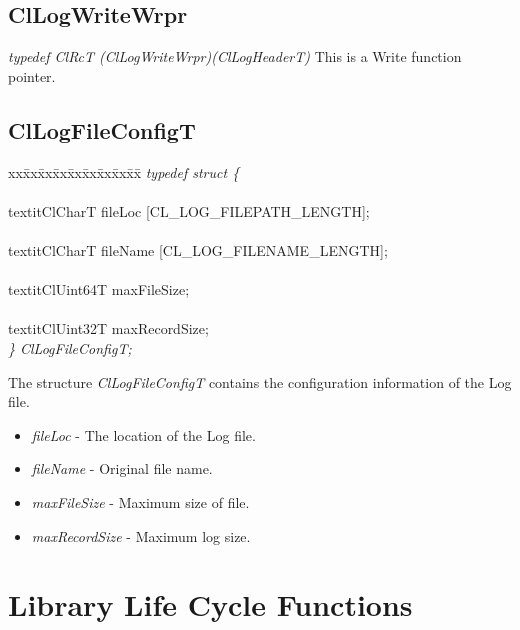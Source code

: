 \subsection{ClLogWriteWrpr}
\textit{typedef Cl\-Rc\-T (Cl\-Log\-Write\-Wrpr)(Cl\-Log\-Header\-T)}
\newline
\newline
This is a Write function pointer.



\subsection{ClLogFileConfigT}
\begin{tabbing}
xx\=xx\=xx\=xx\=xx\=xx\=xx\=xx\=xx\=\kill
\textit{typedef struct \{}\\
\>\>\>\\textit{ClCharT fileLoc \mbox{[}CL\_LOG\_FILEPATH\_LENGTH\mbox{]};}\\
\>\>\>\\textit{ClCharT fileName \mbox{[}CL\_LOG\_FILENAME\_LENGTH\mbox{]};}\\
\>\>\>\\textit{ClUint64T maxFileSize;}\\
\>\>\>\\textit{ClUint32T maxRecordSize;}\\
\textit{\} ClLogFileConfigT;}\end{tabbing}
The structure \textit{ClLogFileConfigT} contains the configuration information of the Log file.
\begin{itemize}
\item
\textit{fileLoc} - The location of the Log file.
\item
\textit{fileName} - Original file name.
\item
\textit{maxFileSize} - Maximum size of file.
\item
\textit{maxRecordSize} - Maximum log size.
\end{itemize}


\newpage
\section{Library Life Cycle Functions}

